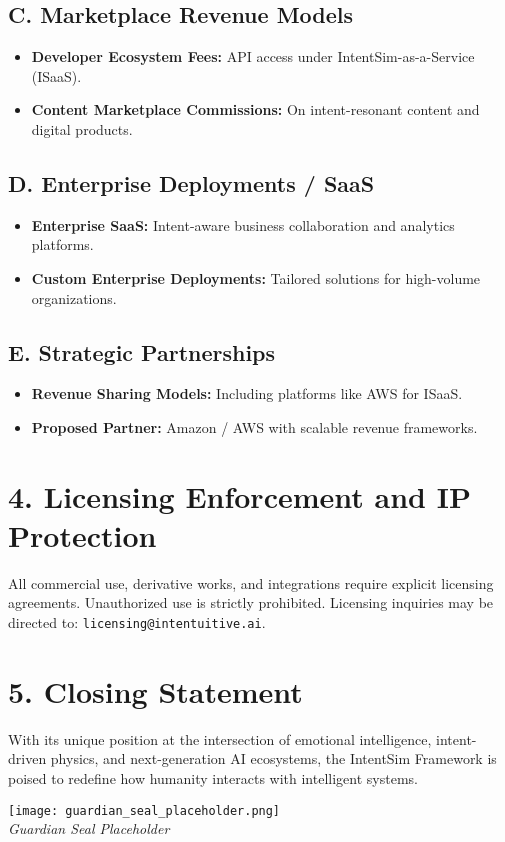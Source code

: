 \documentclass[12pt]{article}
\begin{document}
\subsection*{C. Marketplace Revenue Models}
\begin{itemize}
    \item \textbf{Developer Ecosystem Fees:} API access under IntentSim-as-a-Service (ISaaS).
    \item \textbf{Content Marketplace Commissions:} On intent-resonant content and digital products.
\end{itemize}

\subsection*{D. Enterprise Deployments / SaaS}
\begin{itemize}
    \item \textbf{Enterprise SaaS:} Intent-aware business collaboration and analytics platforms.
    \item \textbf{Custom Enterprise Deployments:} Tailored solutions for high-volume organizations.
\end{itemize}

\subsection*{E. Strategic Partnerships}
\begin{itemize}
    \item \textbf{Revenue Sharing Models:} Including platforms like AWS for ISaaS.
    \item \textbf{Proposed Partner:} Amazon / AWS with scalable revenue frameworks.
\end{itemize}

\section*{4. Licensing Enforcement and IP Protection}
All commercial use, derivative works, and integrations require explicit licensing agreements. Unauthorized use is strictly prohibited. Licensing inquiries may be directed to: \texttt{licensing@intentuitive.ai}.

\section*{5. Closing Statement}
With its unique position at the intersection of emotional intelligence, intent-driven physics, and next-generation AI ecosystems, the IntentSim Framework is poised to redefine how humanity interacts with intelligent systems. 

\begin{center}
\texttt{[image: guardian\_seal\_placeholder.png]} \\
\textit{Guardian Seal Placeholder}
\end{center}
\end{document}
